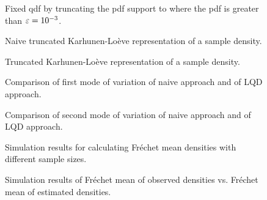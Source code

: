 \begin{figure}[h]
    \centering
    
    \caption{Fixed qdf by truncating the pdf support to where the pdf is greater than
    $\varepsilon = \nobreak 10^{-3}$.}
    \label{fig:fixed_qdf}
\end{figure}

\begin{figure}[h]
    \centering
    
    \caption{Naive truncated Karhunen-Loève representation of a sample density.}
    \label{fig:naive_trunc_rep}
\end{figure}

\begin{figure}[h]
    \centering
    
    \caption{Truncated Karhunen-Loève representation of a sample density.}
    \label{fig:trunc_rep}
\end{figure}

\begin{figure}[h]
    \centering
    
    \caption{Comparison of first mode of variation of naive approach and of LQD approach.}
    \label{fig:1st_modes}
\end{figure}

\begin{figure}[h]
    \centering
    
    \caption{Comparison of second mode of variation of naive approach and of LQD approach.}
    \label{fig:2nd_modes}
\end{figure}

\begin{figure}[h]
    \centering
    
    \caption{Simulation results for calculating Fréchet mean densities with different
    sample sizes.}
    \label{fig:sim_f_mean}
\end{figure}

\begin{figure}[h]
    \centering
    
    \caption{Simulation results of Fréchet mean of observed densities vs.
    Fréchet mean of estimated densities.}
    \label{fig:sim_f_denstimation}
\end{figure}

